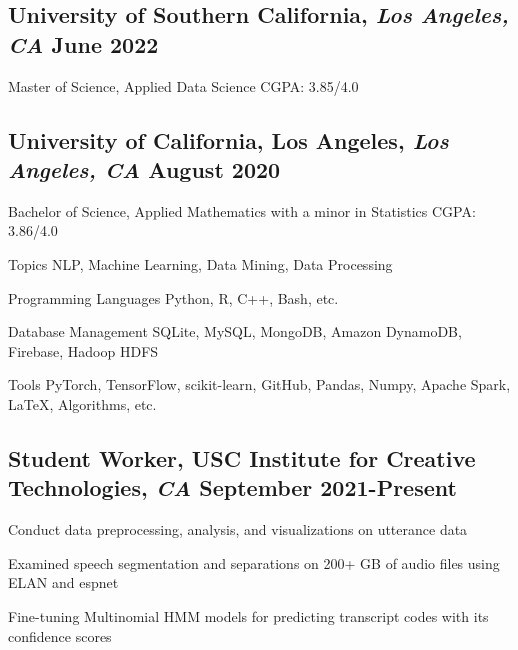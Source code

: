 \documentclass[11pt]{article}
\begin{document}
\subsection*{University of Southern California{\normalfont, \textit{Los Angeles, CA} \hfill June 2022}}
\noindent
Master of Science, Applied Data Science
\hfill
CGPA: 3.85/4.0


\subsection*{University of California, Los Angeles{\normalfont, \textit{Los Angeles, CA} \hfill August 2020}}
\noindent
Bachelor of Science, Applied Mathematics with a minor in Statistics
\hfill
CGPA: 3.86/4.0

\vspace{0.1in}

\begin{compactdesc}
	\item[Topics] NLP, Machine Learning, Data Mining, Data Processing
    \item[Programming Languages] Python, R, C++, Bash, etc.
    \item[Database Management] SQLite, MySQL, MongoDB, Amazon DynamoDB, Firebase, Hadoop HDFS
    \item[Tools] PyTorch, TensorFlow, scikit-learn, GitHub, Pandas, Numpy, Apache Spark, \LaTeX,
    Algorithms, etc.
\end{compactdesc}

\vspace{0.1in}

\subsection*{Student Worker{\normalfont, USC Institute for Creative
            Technologies,
            \textit{CA} \hfill
            September 2021-Present}}
\begin{compactitem}
    \item Conduct data preprocessing, analysis, and visualizations on utterance data
    \item Examined speech segmentation and separations on 200+ GB of audio files using ELAN and espnet
    \item Fine-tuning Multinomial HMM models for predicting transcript codes with its confidence scores
\end{compactitem}
\end{document}
